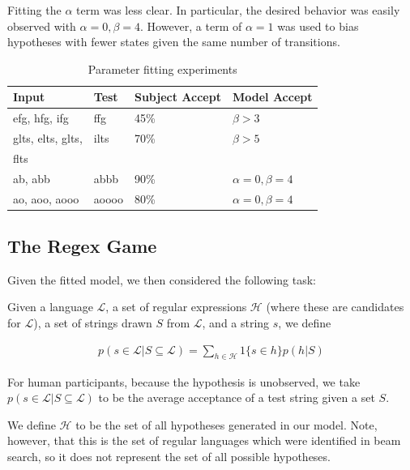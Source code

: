 \documentclass[10pt,letterpaper]{article}
\begin{document}
Fitting the $\alpha$ term was less clear. In particular, the desired behavior was easily observed with $\alpha=0,\beta=4$. However, a term of $\alpha=1$ was used to bias hypotheses with fewer states given the same number of transitions.

\begin{table}['ht]
\begin{center} 
\caption{Parameter fitting experiments} 
\label{parameter-table} 
\vskip 0.12in
\begin{tabular}{llll} 
\hline
Input  & Test & Subject Accept & Model Accept
\\ \hline
efg, hfg, ifg & ffg & 45\% & $\beta > 3$
\\ \hline
glts, elts, glts, & ilts & 70\% & $\beta > 5$
\\ flts
\\ \hline
ab, abb & abbb & 90\% & $\alpha = 0, \beta = 4$
\\ \hline
ao, aoo, aooo & aoooo & 80\% & $\alpha = 0, \beta=4$
\\ \hline
\end{tabular} 
\end{center} 
\end{table}

\subsection{The Regex Game}
Given the fitted model, we then considered the following task: 

Given a language $\mathcal{L}$, a set of regular expressions $\mathcal{H}$ (where these are candidates for $\mathcal{L}$), a set of strings drawn $S$ from $\mathcal{L}$, and a string $s$, we define

\begin{align*}
	p(s \in \mathcal{L} | S \subseteq {\mathcal{L}}) = \sum_{h \in \mathcal{H}} 1 \{s \in h\} p(h|S)
\end{align*}

For human participants, because the hypothesis is unobserved, we take $p(s \in \mathcal{L} | S \subseteq {\mathcal{L}}) $ to be the average acceptance of a test string given a set $S$. 

We define $\mathcal{H}$ to be the set of all hypotheses generated in our model. Note, however, that this is the set of regular languages which were identified in beam search, so it does not represent the set of all possible hypotheses.
\end{document}

